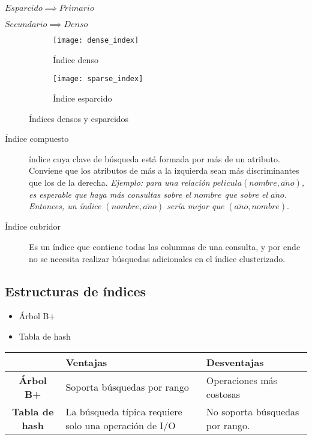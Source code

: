 \documentclass[a4paper, twoside]{article}
\begin{document}
\begin{center}
	$Esparcido\implies Primario$
\end{center}

\begin{center}
	$Secundario\implies Denso$
\end{center}

\begin{figure}[H]
	\centering
	\begin{subfigure}{0.48\textwidth}
		\texttt{[image: dense\_index]}
		\caption{Índice denso}
	\end{subfigure}
	\begin{subfigure}{0.48\textwidth}
		\texttt{[image: sparse\_index]}
		\caption{Índice esparcido}
	\end{subfigure}	
	\caption{Índices densos y esparcidos}
\end{figure}

\begin{description}
	\item[Índice compuesto] índice cuya clave de búsqueda está formada por más de un atributo. Conviene que los atributos de más a la izquierda sean más discriminantes que los de la derecha. \emph{Ejemplo: para una relación $pelicula(nombre,a\tilde{n}o)$, es esperable que haya más consultas sobre el $nombre$ que sobre el $a\tilde{n}o$. Entonces, un índice $(nombre,a\tilde{n}o)$ sería mejor que $(a\tilde{n}o,nombre).$}

	\item[Índice cubridor] Es un índice que contiene todas las columnas de una consulta, y por ende no se necesita realizar búsquedas adicionales en el índice clusterizado.
\end{description}

\subsection{Estructuras de índices}
\begin{itemize}
	\item Árbol B+
	\item Tabla de hash
\end{itemize}

\begin{center}
	\begin{tabular}{|c|p{5cm}|p{5cm}|}
		\hline 
		 & \textbf{Ventajas} & \textbf{Desventajas}\\
		\hline 
		\hline 
		\textbf{Árbol B+} & Soporta búsquedas por rango & Operaciones más costosas\\
		\hline 
		\textbf{Tabla de hash} & La búsqueda típica requiere solo una operación de I/O & No soporta búsquedas por rango. \\
		\hline 
	\end{tabular}
\end{center}
\end{document}
